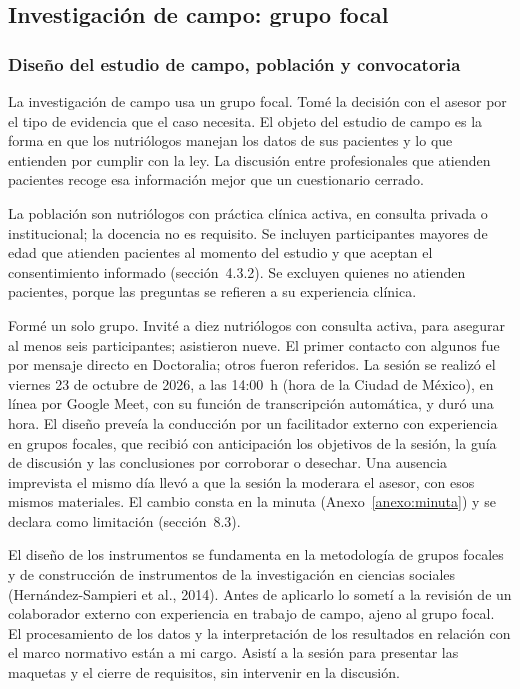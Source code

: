 \documentclass[12pt, a4paper]{article}
\begin{document}
\subsection{Investigación de campo: grupo focal}
 
\subsubsection{Diseño del estudio de campo, población y convocatoria}
 
La investigación de campo usa un grupo focal. Tomé la decisión
con el asesor por el tipo de evidencia que el caso necesita. El
objeto del estudio de campo es la forma en que los nutriólogos manejan
los datos de sus pacientes y lo que entienden por cumplir con la ley. La
discusión entre profesionales que atienden pacientes recoge esa
información mejor que un cuestionario cerrado.
 
La población son nutriólogos con práctica clínica activa, en consulta
privada o institucional; la docencia no es requisito. Se incluyen
participantes mayores de edad que atienden pacientes al momento del
estudio y que aceptan el consentimiento informado (sección~4.3.2). Se
excluyen quienes no atienden pacientes, porque las preguntas se refieren
a su experiencia clínica.
 
Formé un solo grupo. Invité a diez nutriólogos con consulta activa, para asegurar al
menos seis participantes; asistieron nueve. El primer contacto con algunos fue por
mensaje directo en Doctoralia; otros fueron referidos. La sesión se realizó el
viernes 23 de octubre de 2026, a las 14:00~h (hora de la Ciudad de
México), en línea por Google Meet, con su función de transcripción
automática, y duró una hora. El diseño preveía la conducción por un
facilitador externo con experiencia en grupos focales, que recibió con
anticipación los objetivos de la sesión, la guía de discusión y las
conclusiones por corroborar o desechar. Una ausencia imprevista el mismo
día llevó a que la sesión la moderara el asesor, con esos
mismos materiales. El cambio consta en la minuta
(Anexo~\ref{anexo:minuta}) y se declara como limitación (sección~8.3).

El diseño de los instrumentos se fundamenta en la metodología de grupos
focales y de construcción de instrumentos de la investigación en
ciencias sociales (Hernández-Sampieri et al., 2014). Antes de aplicarlo lo sometí a la revisión de un colaborador externo con
experiencia en trabajo de campo, ajeno al grupo focal. El procesamiento
de los datos y la interpretación de los resultados en relación con el
marco normativo están a mi cargo. Asistí a la sesión para
presentar las maquetas y el cierre de requisitos, sin intervenir en la
discusión.
 
\end{document}
